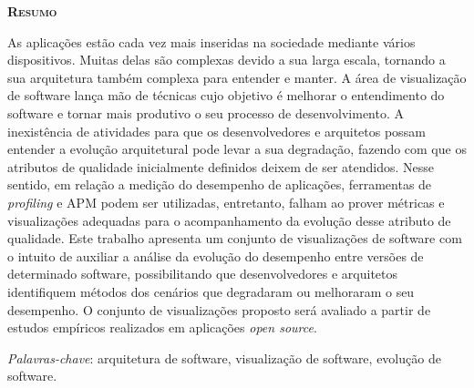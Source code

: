\begin{center}
	{\Large{\textbf{\mscThesisTitle}}}
\end{center}

\vspace{1cm}


\vspace{1cm}

\begin{center}
	\Large{\textsc{\textbf{Resumo}}}
\end{center}

\noindent As aplicações estão cada vez mais inseridas na sociedade mediante vários dispositivos. Muitas delas são complexas devido a sua larga escala, tornando a sua arquitetura também complexa para entender e manter. A área de visualização de software lança mão de técnicas cujo objetivo é melhorar o entendimento do software e tornar mais produtivo o seu processo de desenvolvimento. A inexistência de atividades para que os desenvolvedores e arquitetos possam entender a evolução arquitetural pode levar a sua degradação, fazendo com que os atributos de qualidade inicialmente definidos deixem de ser atendidos. Nesse sentido, em relação a medição do desempenho de aplicações, ferramentas de \textit{profiling} e APM podem ser utilizadas, entretanto, falham ao prover métricas e visualizações adequadas para o acompanhamento da evolução desse atributo de qualidade. Este trabalho apresenta um conjunto de visualizações de software com o intuito de auxiliar a análise da evolução do desempenho entre versões de determinado software, possibilitando que desenvolvedores e arquitetos identifiquem métodos dos cenários que degradaram ou melhoraram o seu desempenho. O conjunto de visualizações proposto será avaliado a partir de estudos empíricos realizados em aplicações \textit{open source}.

\noindent\textit{Palavras-chave}: arquitetura de software, visualização de software, evolução de software.